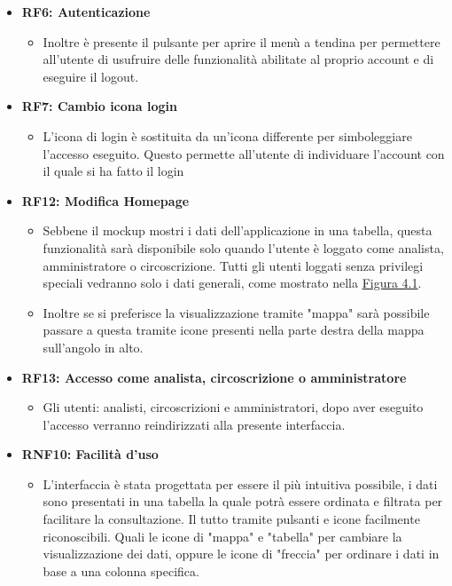     \begin{itemize}
        \item \textbf{RF6: Autenticazione} \begin{itemize} 
            \item Inoltre è presente il pulsante per aprire il menù a tendina per permettere all'utente di usufruire delle funzionalità abilitate al proprio account e di eseguire il logout.
        \end{itemize}
        \item \textbf{RF7: Cambio icona login} \begin{itemize} 
            \item L'icona di login è sostituita da un'icona differente per simboleggiare l'accesso eseguito. Questo permette all'utente di individuare l'account con il quale si ha fatto il login
        \end{itemize}
        \item \textbf{RF12: Modifica Homepage} \begin{itemize}
            \item Sebbene il mockup mostri i dati dell'applicazione in una tabella, questa funzionalità sarà disponibile solo quando l'utente è loggato come analista, amministratore o circoscrizione. Tutti gli utenti loggati senza privilegi speciali vedranno solo i dati generali, come mostrato nella \hyperref[fig:4.1]{Figura 4.1}.
            \item Inoltre se si preferisce la visualizzazione tramite "mappa" sarà possibile passare a questa tramite icone presenti nella parte destra della mappa sull'angolo in alto. 
        \end{itemize}
        \item \textbf{RF13: Accesso come analista, circoscrizione o amministratore} \begin{itemize}
            \item Gli utenti: analisti, circoscrizioni e amministratori, dopo aver eseguito l'accesso verranno reindirizzati alla presente interfaccia.
        \end{itemize}
        \item \textbf{RNF10: Facilità d’uso} \begin{itemize}
            \item L'interfaccia è stata progettata per essere il più intuitiva possibile, i dati sono presentati in una tabella la quale potrà essere ordinata e filtrata per facilitare la consultazione. Il tutto tramite pulsanti e icone facilmente riconoscibili. Quali le icone di "mappa" e "tabella" per cambiare la visualizzazione dei dati, oppure le icone di "freccia" per ordinare i dati in base a una colonna specifica.

\end{itemize}
\end{itemize}
